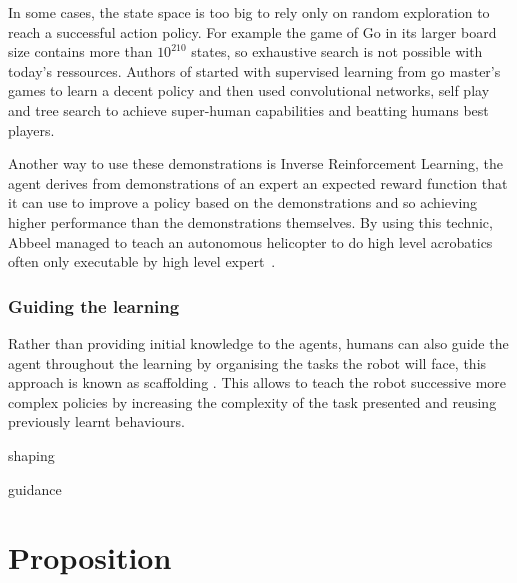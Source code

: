 \documentclass[letterpaper]{article} %
\begin{document}
In some cases, the state space is too big to rely only on random exploration to
reach a successful action policy. For example the game of Go in its larger board
size contains more than $10^{210}$ states, so exhaustive search is not possible
with today's ressources. Authors of \cite{silver2016mastering} started with
supervised learning from go master's games to learn a decent policy and then
used convolutional networks, self play and tree search to achieve super-human
capabilities and beatting humans best players.

Another way to use these demonstrations is Inverse
Reinforcement Learning, the agent derives from demonstrations of an expert an
expected reward function that it can use to improve a policy based on the
demonstrations and so achieving higher performance than the demonstrations
themselves. By using this technic, Abbeel managed to teach an autonomous
helicopter to do high level acrobatics often only executable by high level
expert~\cite{abbeel2004apprenticeship}. 


\subsubsection{Guiding the learning}
Rather than providing initial knowledge to the agents, humans can also guide the
agent throughout the learning by organising the tasks the robot will face, this
approach is known as scaffolding \cite{saunders2006teaching}. This allows to
teach the robot successive more complex policies by increasing the complexity of
the task presented and reusing previously learnt behaviours.


shaping \cite{knox2009interactively}

guidance \cite{thomaz2008teachable}


\section{Proposition}
\end{document}
